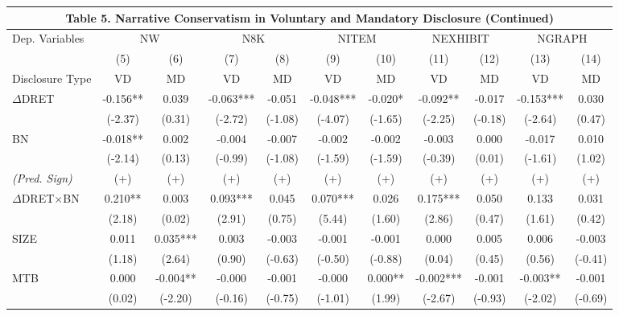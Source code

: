 \begin{table}
	\begin{center}
		\tabcolsep=0.11cm
		\begin{tabular}{lcccccccccc}
			\multicolumn{11}{c}{\textbf{Table 5. Narrative Conservatism in Voluntary and Mandatory Disclosure (Continued)}} \\
			\toprule
			\toprule
			Dep. Variables & \multicolumn{2}{c}{NW} & \multicolumn{2}{c}{N8K} & \multicolumn{2}{c}{NITEM} & \multicolumn{2}{c}{NEXHIBIT} & \multicolumn{2}{c}{NGRAPH} \\
			\cmidrule{2-11}
			& (5) & (6) & (7) & (8) & (9) & (10) & (11) & (12) & (13) & (14) \\
			Disclosure Type & VD & MD & VD & MD & VD & MD & VD & MD & VD & MD \\
			\midrule
			$\Delta$DRET & -0.156** & 0.039 & -0.063*** & -0.051 & -0.048*** & -0.020* & -0.092** & -0.017 & -0.153*** & 0.030 \\
			& (-2.37) & (0.31) & (-2.72) & (-1.08) & (-4.07) & (-1.65) & (-2.25) & (-0.18) & (-2.64) & (0.47) \\
			BN & -0.018** & 0.002 & -0.004 & -0.007 & -0.002 & -0.002 & -0.003 & 0.000 & -0.017 & 0.010 \\
			& (-2.14) & (0.13) & (-0.99) & (-1.08) & (-1.59) & (-1.59) & (-0.39) & (0.01) & (-1.61) & (1.02) \\
			\rowcolor[rgb]{ .906,  .902,  .902} \textit{(Pred. Sign)} & (+) & (+) & (+) & (+) & (+) & (+) & (+) & (+) & (+) & (+) \\
			\rowcolor[rgb]{ .906,  .902,  .902} $\Delta$DRET$\times$BN & 0.210** & 0.003 & 0.093*** & 0.045 & 0.070*** & 0.026 & 0.175*** & 0.050 & 0.133 & 0.031 \\
			\rowcolor[rgb]{ .906,  .902,  .902} & (2.18) & (0.02) & (2.91) & (0.75) & (5.44) & (1.60) & (2.86) & (0.47) & (1.61) & (0.42) \\
			SIZE & 0.011 & 0.035*** & 0.003 & -0.003 & -0.001 & -0.001 & 0.000 & 0.005 & 0.006 & -0.003 \\
			& (1.18) & (2.64) & (0.90) & (-0.63) & (-0.50) & (-0.88) & (0.04) & (0.45) & (0.56) & (-0.41) \\
			MTB & 0.000 & -0.004** & -0.000 & -0.001 & -0.000 & 0.000** & -0.002*** & -0.001 & -0.003** & -0.001 \\
			& (0.02) & (-2.20) & (-0.16) & (-0.75) & (-1.01) & (1.99) & (-2.67) & (-0.93) & (-2.02) & (-0.69) \\

\end{tabular}
\end{center}
\end{table}
